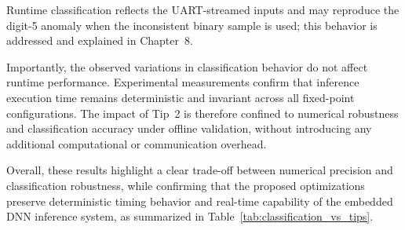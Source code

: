 Runtime classification reflects the UART-streamed inputs and may reproduce the
digit-5 anomaly when the inconsistent binary sample is used; this behavior is
addressed and explained in Chapter~8.


Importantly, the observed variations in classification behavior do not affect
runtime performance.
Experimental measurements confirm that inference execution time remains
deterministic and invariant across all fixed-point configurations.
The impact of Tip~2 is therefore confined to numerical robustness and
classification accuracy under offline validation, without introducing any
additional computational or communication overhead.

Overall, these results highlight a clear trade-off between numerical precision and
classification robustness, while confirming that the proposed optimizations
preserve deterministic timing behavior and real-time capability of the embedded
DNN inference system, as summarized in Table~\ref{tab:classification_vs_tips}.


\begin{table}[H]
\centering
\caption{Classification accuracy under different fixed-point configurations.
Offline validation is always performed on Q8.8 embedded images, while runtime
accuracy refers to UART-streamed inputs (digits 0--9).}
\label{tab:classification_vs_tips}
\renewcommand{\arraystretch}{1.25}
\end{table}

